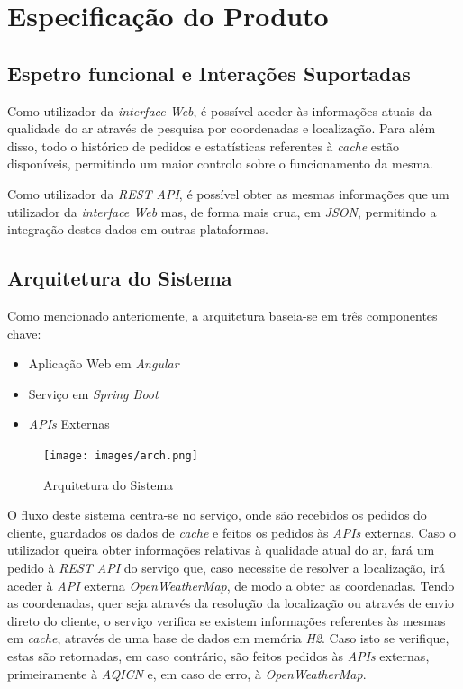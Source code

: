 \documentclass[10pt,english]{article}
\begin{document}
\clearpage

\section{Especificação do Produto}

\subsection{Espetro funcional e Interações Suportadas}

\par Como utilizador da \textit{interface Web}, é possível aceder às informações atuais da qualidade do ar através de pesquisa por coordenadas e localização. Para além disso, todo o histórico de pedidos e estatísticas referentes à \textit{cache} estão disponíveis, permitindo um maior controlo sobre o funcionamento da mesma.

\par Como utilizador da \textit{REST API}, é possível obter as mesmas informações que um utilizador da \textit{interface Web} mas, de forma mais crua, em \textit{JSON}, permitindo a integração destes dados em outras plataformas.

\subsection{Arquitetura do Sistema}

\par Como mencionado anteriomente, a arquitetura baseia-se em três componentes chave:

\begin{itemize}
    \item Aplicação Web em \textit{Angular}
    \item Serviço em \textit{Spring Boot}
    \item \textit{APIs} Externas
\end{itemize}

\begin{figure}[h]
    \centering
    \texttt{[image: images/arch.png]}
    \caption{Arquitetura do Sistema}
\end{figure}

\par O fluxo deste sistema centra-se no serviço, onde são recebidos os pedidos do cliente, guardados os dados de \textit{cache} e feitos os pedidos às \textit{APIs} externas. Caso o utilizador queira obter informações relativas à qualidade atual do ar, fará um pedido à \textit{REST API} do serviço que, caso necessite de resolver a localização, irá aceder à \textit{API} externa \textit{OpenWeatherMap}, de modo a obter as coordenadas. Tendo as coordenadas, quer seja através da resolução da localização ou através de envio direto do cliente, o serviço verifica se existem informações referentes às mesmas em \textit{cache}, através de uma base de dados em memória \textit{H2}. Caso isto se verifique, estas são retornadas, em caso contrário, são feitos pedidos às \textit{APIs} externas, primeiramente à \textit{AQICN} e, em caso de erro, à \textit{OpenWeatherMap}.
\end{document}
